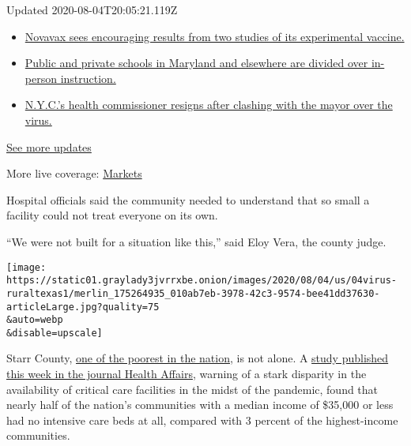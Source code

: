 Updated 2020-08-04T20:05:21.119Z

\begin{itemize}
\tightlist
\item
  \href{https://www.nytimes3xbfgragh.onion/2020/08/04/world/coronavirus-cases.html?action=click\&pgtype=Article\&state=default\&region=MAIN_CONTENT_1\&context=storylines_live_updates\#link-1228a480}{Novavax
  sees encouraging results from two studies of its experimental
  vaccine.}
\item
  \href{https://www.nytimes3xbfgragh.onion/2020/08/04/world/coronavirus-cases.html?action=click\&pgtype=Article\&state=default\&region=MAIN_CONTENT_1\&context=storylines_live_updates\#link-4825b93}{Public
  and private schools in Maryland and elsewhere are divided over
  in-person instruction.}
\item
  \href{https://www.nytimes3xbfgragh.onion/2020/08/04/world/coronavirus-cases.html?action=click\&pgtype=Article\&state=default\&region=MAIN_CONTENT_1\&context=storylines_live_updates\#link-4d1eafa8}{N.Y.C.'s
  health commissioner resigns after clashing with the mayor over the
  virus.}
\end{itemize}

\href{https://www.nytimes3xbfgragh.onion/2020/08/04/world/coronavirus-cases.html?action=click\&pgtype=Article\&state=default\&region=MAIN_CONTENT_1\&context=storylines_live_updates}{See
more updates}

More live coverage:
\href{https://www.nytimes3xbfgragh.onion/live/2020/08/04/business/stock-market-today-coronavirus?action=click\&pgtype=Article\&state=default\&region=MAIN_CONTENT_1\&context=storylines_live_updates}{Markets}

Hospital officials said the community needed to understand that so small
a facility could not treat everyone on its own.

``We were not built for a situation like this,'' said Eloy Vera, the
county judge.

\texttt{[image: https://static01.graylady3jvrrxbe.onion/images/2020/08/04/us/04virus-ruraltexas1/merlin\_175264935\_010ab7eb-3978-42c3-9574-bee41dd37630-articleLarge.jpg?quality=75\\\&auto=webp\\\&disable=upscale]}

Starr County,
\href{https://www.usatoday.com/story/money/2019/01/25/poorest-counties-in-the-us-median-household-income/38870175/}{one
of the poorest in the nation}, is not alone. A
\href{https://www.healthaffairs.org/doi/10.1377/hlthaff.2020.00581}{study
published this week in the journal Health Affairs}, warning of a stark
disparity in the availability of critical care facilities in the midst
of the pandemic, found that nearly half of the nation's communities with
a median income of \$35,000 or less had no intensive care beds at all,
compared with 3 percent of the highest-income communities.


